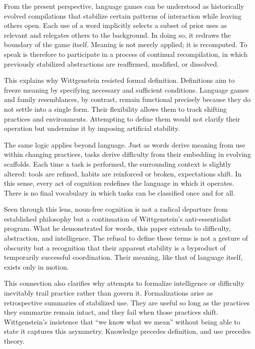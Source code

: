 \documentclass[12pt]{article}
\begin{document}
From the present perspective, language games can be understood as historically evolved compilations that stabilize certain patterns of interaction while leaving others open. Each use of a word implicitly selects a subset of prior uses as relevant and relegates others to the background. In doing so, it redraws the boundary of the game itself. Meaning is not merely applied; it is recomputed. To speak is therefore to participate in a process of continual recompilation, in which previously stabilized abstractions are reaffirmed, modified, or dissolved.

This explains why Wittgenstein resisted formal definition. Definitions aim to freeze meaning by specifying necessary and sufficient conditions. Language games and family resemblances, by contrast, remain functional precisely because they do not settle into a single form. Their flexibility allows them to track shifting practices and environments. Attempting to define them would not clarify their operation but undermine it by imposing artificial stability.

The same logic applies beyond language. Just as words derive meaning from use within changing practices, tasks derive difficulty from their embedding in evolving scaffolds. Each time a task is performed, the surrounding context is slightly altered: tools are refined, habits are reinforced or broken, expectations shift. In this sense, every act of cognition redefines the language in which it operates. There is no final vocabulary in which tasks can be classified once and for all.

Seen through this lens, noun-free cognition is not a radical departure from established philosophy but a continuation of Wittgenstein’s anti-essentialist program. What he demonstrated for words, this paper extends to difficulty, abstraction, and intelligence. The refusal to define these terms is not a gesture of obscurity but a recognition that their apparent stability is a byproduct of temporarily successful coordination. Their meaning, like that of language itself, exists only in motion.

This connection also clarifies why attempts to formalize intelligence or difficulty inevitably trail practice rather than govern it. Formalizations arise as retrospective summaries of stabilized use. They are useful so long as the practices they summarize remain intact, and they fail when those practices shift. Wittgenstein’s insistence that “we know what we mean” without being able to state it captures this asymmetry. Knowledge precedes definition, and use precedes theory.
\end{document}
